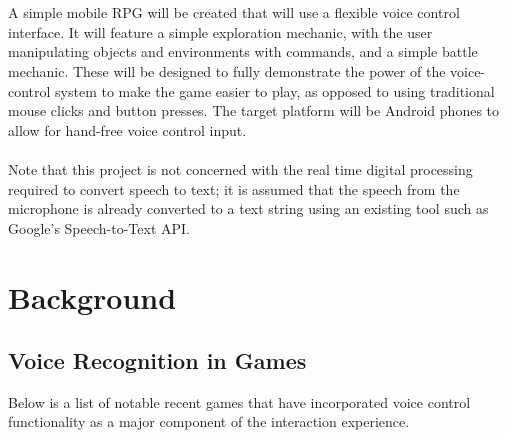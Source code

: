 \documentclass[12pt]{article}
\begin{document}
\\
\\
A simple mobile RPG will be created that will use a flexible voice control interface. It will feature a simple exploration mechanic, with the user manipulating objects and environments with commands, and a simple battle mechanic. These will be designed to fully demonstrate the power of the voice-control system to make the game easier to play, as opposed to using traditional mouse clicks and button presses. The target platform will be Android phones to allow for hand-free voice control input.
\\
\\
Note that this project is not concerned with the real time digital processing required to convert speech to text; it is assumed that the speech from the microphone is already converted to a text string using an existing tool such as Google's Speech-to-Text API.

\newpage
\section{Background}
\subsection{Voice Recognition in Games}
Below is a list of notable recent games that have incorporated voice control functionality as a major component of the interaction experience.
\end{document}
